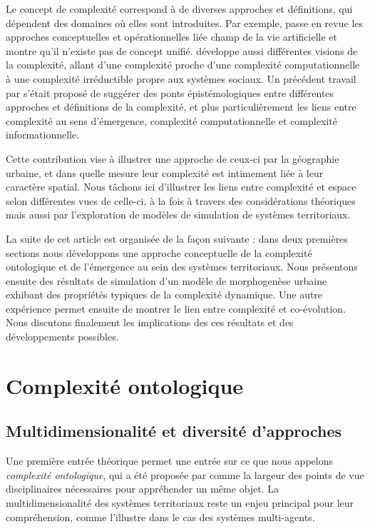 \documentclass[11pt]{article}
\begin{document}
Le concept de complexité correspond à de diverses approches et définitions, qui dépendent des domaines où elles sont introduites. Par exemple, \cite{chu2008criteria} passe en revue les approches conceptuelles et opérationnelles liée champ de la vie artificielle et montre qu'il n'existe pas de concept unifié. \cite{deffuant2015visions} développe aussi différentes visions de la complexité, allant d'une complexité proche d'une complexité computationnelle à une complexité irréductible propre aux systèmes sociaux. Un précédent travail par \cite{raimbault2018relating} s'était proposé de suggérer des ponts épistémologiques entre différentes approches et définitions de la complexité, et plus particulièrement les liens entre complexité au sens d'émergence, complexité computationnelle et complexité informationnelle. 

Cette contribution vise à illustrer une approche de ceux-ci par la géographie urbaine, et dans quelle mesure leur complexité est intimement liée à leur caractère spatial. Nous tâchons ici d'illustrer les liens entre complexité et espace selon différentes vues de celle-ci, à la fois à travers des considérations théoriques mais aussi par l'exploration de modèles de simulation de systèmes territoriaux.

La suite de cet article est organisée de la façon suivante : dans deux premières sections nous développons une approche conceptuelle de la complexité ontologique et de l'émergence au sein des systèmes territoriaux. Nous présentons ensuite des résultats de simulation d'un modèle de morphogenèse urbaine exhibant des propriétés typiques de la complexité dynamique. Une autre expérience permet ensuite de montrer le lien entre complexité et co-évolution. Nous discutons finalement les implications des ces résultats et des développements possibles.



\section{Complexité ontologique}


\subsection{Multidimensionalité et diversité d'approches}


Une première entrée théorique permet une entrée sur ce que nous appelons \emph{complexité ontologique}, qui a été proposée par \cite{pumain2003approche} comme la largeur des points de vue disciplinaires nécessaires pour appréhender un même objet. La multidimensionalité des systèmes territoriaux reste un enjeu principal pour leur compréhension, comme l'illustre \cite{perez2016agent} dans le cas des systèmes multi-agents.
\end{document}
